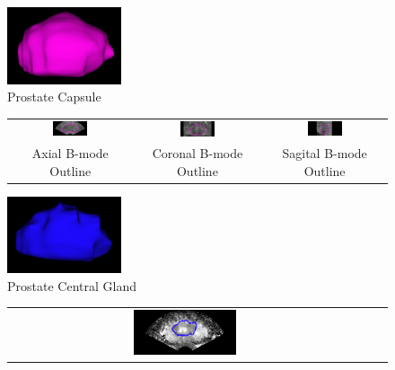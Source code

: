 \begin{figure}[htb!]
\centering
\includegraphics[width=0.3\textwidth]{zach/Cap_Modeling_Images/3D_Capsule.png} \\
Prostate Capsule \\
\begin{tabular}{ccc}
\includegraphics[width=0.3\textwidth]{zach/Cap_Modeling_Images/Axial_Cap.png} &
\includegraphics[width=0.3\textwidth]{zach/Cap_Modeling_Images/Coronal_Cap.png} &
\includegraphics[width=0.3\textwidth]{zach/Cap_Modeling_Images/Sagittal_Cap.png} \\
Axial B-mode Outline & Coronal B-mode Outline & Sagital B-mode Outline \\
\end{tabular}
\includegraphics[width=0.3\textwidth]{zach/CG_Modeling_Images/3D_CG.png} \\
Prostate Central Gland \\
\begin{tabular}{ccc}
\includegraphics[width=0.3\textwidth]{zach/CG_Modeling_Images/Axial_CG.png} &

\end{tabular}
\end{figure}
